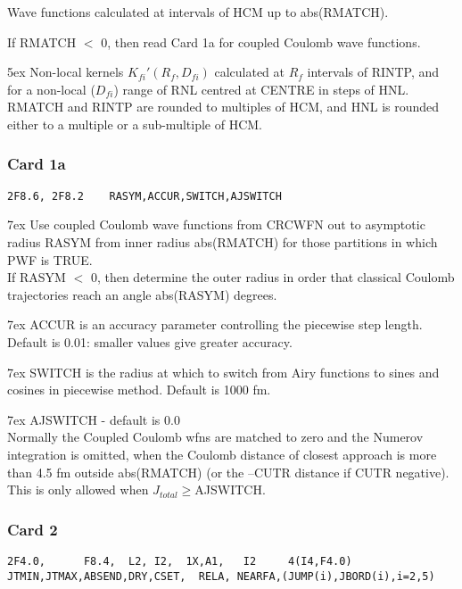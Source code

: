 \documentclass[11pt]{article}
\begin{document}
Wave functions calculated at intervals of HCM up to abs(RMATCH).

If RMATCH $<$ 0, then read Card 1a for  coupled Coulomb wave functions.

\hangindent 5ex
Non-local kernels $K_{fi}'(R_{f},D_{fi})$ calculated at $R_f$ intervals of RINTP,
and for a non-local ($D_{fi}$) range of RNL centred at CENTRE in steps of HNL.
RMATCH and RINTP are rounded to multiples of HCM, and HNL is rounded either to
a multiple or a sub-multiple of HCM.


%
\subsubsection*{Card 1a}
\begin{verbatim}
2F8.6, 2F8.2    RASYM,ACCUR,SWITCH,AJSWITCH
\end{verbatim}


\hangindent 7ex
Use coupled Coulomb wave functions from CRCWFN out to asymptotic radius RASYM from
inner radius abs(RMATCH) for those partitions in which PWF is TRUE.
\\
If RASYM $<$ 0, then determine the outer radius in order that classical
Coulomb trajectories reach an angle abs(RASYM) degrees.

\hangindent 7ex
ACCUR is an accuracy parameter controlling the piecewise step length.
Default is 0.01: smaller values give greater accuracy.

\hangindent 7ex
SWITCH is the radius at which to switch from Airy functions
to sines and cosines in piecewise method.  Default is 1000 fm.

\hangindent 7ex
AJSWITCH - default is 0.0
\\
Normally the Coupled Coulomb wfns are matched to zero
and the Numerov integration is omitted,
when the Coulomb distance of closest approach is more than 4.5 fm outside
abs(RMATCH) (or  the  --CUTR distance if   CUTR negative).
This is only allowed when $J_{total} \geq $AJSWITCH.
\bigskip

\subsubsection*{Card 2}
\begin{verbatim}
2F4.0,      F8.4,  L2, I2,  1X,A1,   I2     4(I4,F4.0)
JTMIN,JTMAX,ABSEND,DRY,CSET,  RELA, NEARFA,(JUMP(i),JBORD(i),i=2,5)
\end{verbatim}
\end{document}
